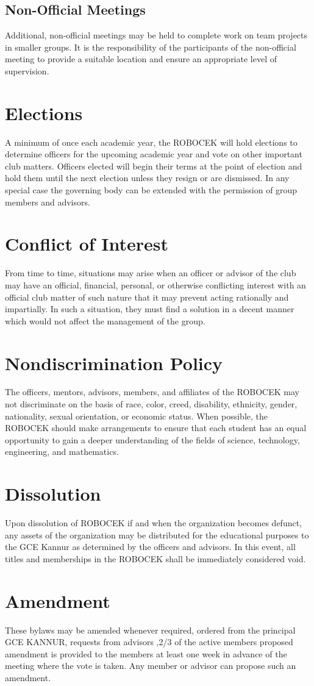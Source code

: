 \subsection{Non-Official Meetings}
Additional, non-official meetings may be held to complete work on team projects in smaller groups. It is the responsibility of the participants of the non-official meeting to provide a suitable location and ensure an appropriate level of supervision. 

\section{Elections}
A minimum of once each academic year, the ROBOCEK will hold elections to determine officers for the upcoming academic year and vote on other important club matters. Officers elected will begin their terms at the point of election and hold them until the next election unless they resign or are dismissed. In any special case the governing body can be extended with the permission of group members and advisors.

\section{Conflict of Interest}
From time to time, situations may arise when an officer or advisor of the club may have an official, financial, personal, or otherwise conflicting interest with an official club matter of such nature that it may prevent acting rationally and  impartially. In such a situation, they must find a solution in a decent manner which would not affect the management of the group.

\section{Nondiscrimination Policy}
The officers, mentors, advisors, members, and affiliates of the ROBOCEK may not discriminate on the basis of race, color, creed, disability, ethnicity, gender, nationality, sexual orientation, or economic status. When possible, the ROBOCEK should make arrangements to ensure that each student has an equal opportunity to gain a deeper understanding of the fields of science, technology, engineering, and mathematics.

\section{Dissolution}
Upon dissolution of ROBOCEK if and when the organization becomes defunct, any assets of the organization may be distributed for the educational purposes to the GCE Kannur as determined by the officers and advisors. In this event, all titles and memberships in the ROBOCEK shall be immediately considered void.

\section{Amendment}
These bylaws may be amended whenever required, ordered from the principal GCE KANNUR, requests from advisors ,2/3 of the active members proposed amendment is provided to the members at least one week in advance of the meeting where the vote is taken. Any member or advisor can propose such an amendment.
